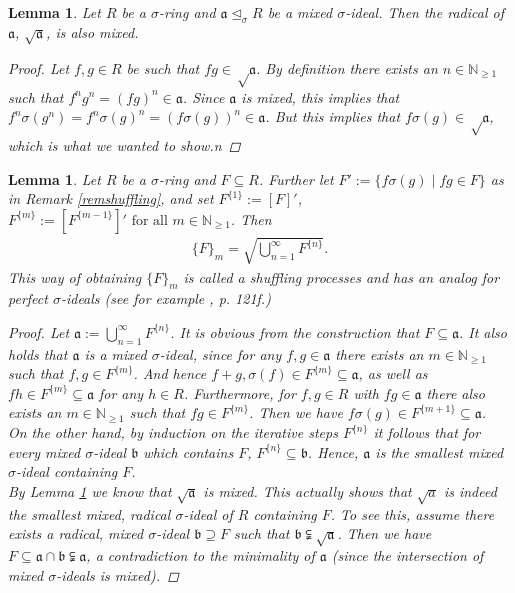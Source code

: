 \documentclass{article}
\def\NE{\mathbb{N}_{\geq1}}
\def\a{\mathfrak{a}}
\def\b{\mathfrak{b}}
\def\s{\sigma}
\def\si{\unlhd_{\sigma}}
\def\fa{\text{ for all }}
\newenvironment{bew}{\begin{proof}[Proof]}{\end{proof}}
\theoremstyle{plain}
\newtheorem{lem}[Satz]{Lemma}
\theoremstyle{definition}
\begin{document}
\begin{lem}\label{sqrtmixed}
Let $R$ be a $\s$-ring and $\a \si R$ be a mixed $\s$-ideal. Then the radical of $\a$, $\sqrt{\a}$, is also mixed.
\begin{bew}
Let $f,g \in R$ be such that $fg \in \sqrt \a$. By definition there exists an $n \in \NE$ such that $f^n g^n = (fg)^n \in \a$. Since $\a$ is mixed, this implies that $f^n \s(g^n) = f^n \s(g)^n = (f\s(g))^n \in \a$. 
But this implies that $f\s(g) \in \sqrt \a$, which is what we wanted to show.n
\end{bew}
\end{lem}

\begin{lem}\label{lemshuffling}
Let $R$ be a $\s$-ring and $F \subseteq R$. Further let $F' := \{f\s(g) \mid fg \in F \}$ as in Remark \ref{remshuffling}, and set $F^{\{1\}}:= [F]'$, $F^{\{m\}}:= [F^{\{m-1\}}]' \fa m \in \NE$. Then
\begin{align} \{F\}_m = \sqrt{\bigcup_{n=1}^{\infty} F^{\{n\}}}. \end{align}
This way of obtaining $\{F\}_m$ is called a shuffling processes and has an analog for perfect $\s$-ideals (see for example \cite{levin}, p. 121f.) 
\begin{proof}
Let $\a:= \bigcup_{n=1}^{\infty} F^{\{n\}}$. It is obvious from the construction that $F \subseteq \a$. It also holds that $\a$ is a mixed $\s$-ideal, since for any $f,g \in \a$ there exists an $m \in \NE$ such that $f,g \in F^{\{m\}}$.
And hence $f + g, \s(f) \in F^{\{m\}} \subseteq \a$, as well as $fh \in F^{\{m\}} \subseteq \a$ for any $h \in R$. Furthermore, for $f, g \in R$ with $fg \in \a$ there also exists an $m \in \NE$ such that $fg \in F^{\{m\}}$. 
Then we have $f\s(g) \in F^{\{m+1\}} \subseteq \a$. \\
\indent On the other hand, by induction on the iterative steps $F^{\{n\}}$ it follows that for every mixed $\s$-ideal $\b$ which contains $F$, $F^{\{n\}} \subseteq \b$. Hence, $\a$ is the smallest mixed $\s$-ideal containing $F$. \\
\indent By Lemma \ref{sqrtmixed} we know that $\sqrt{\a}$ is mixed. This actually shows that $\sqrt a$ is indeed the smallest mixed, radical $\s$-ideal of $R$ containing $F$. To see this, assume there exists a radical, mixed $\s$-ideal $\b \supseteq F$
such that $\b \subsetneqq \sqrt{\a}$. Then we have $F \subseteq \a \cap \b \subsetneqq \a$, a contradiction to the minimality of $\a$ (since the intersection of mixed $\s$-ideals is mixed). 
\end{proof}
\end{lem}
\end{document}
